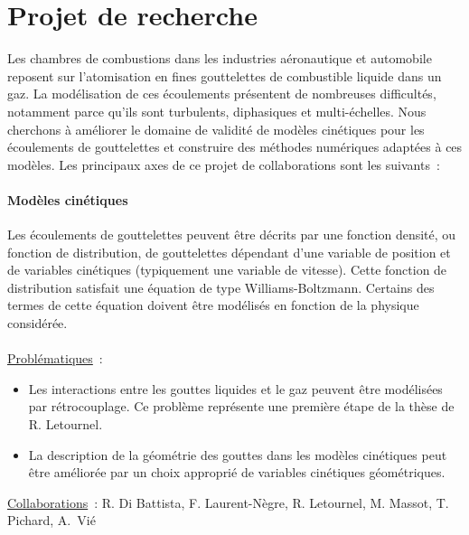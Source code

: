 \documentclass[12pt]{article}
\begin{document}
\section*{Projet de recherche}
Les chambres de combustions dans les industries aéronautique et automobile reposent sur l'atomisation en fines gouttelettes de combustible liquide dans un gaz. La modélisation de ces écoulements présentent de nombreuses difficultés, notamment parce qu'ils sont turbulents, diphasiques et multi-échelles. Nous cherchons à améliorer le domaine de validité de modèles cinétiques pour les écoulements de gouttelettes et construire des méthodes numériques adaptées à ces modèles. Les principaux axes de ce projet de collaborations sont les suivants~:

\paragraph{Modèles cinétiques\\ } 
Les écoulements de gouttelettes peuvent être décrits par une fonction densité, ou fonction de distribution, de gouttelettes dépendant d'une variable de position et de variables cinétiques (typiquement une variable de vitesse). Cette fonction de distribution satisfait une équation de type Williams-Boltzmann. Certains des termes de cette équation doivent être modélisés en fonction de la physique considérée. \\ \\
%
\underline{Problématiques}~: \begin{itemize}
\item Les interactions entre les gouttes liquides et le gaz peuvent être modélisées par rétrocouplage. Ce problème représente une première étape de la thèse de R. Letournel.
\item La description de la géométrie des gouttes dans les modèles cinétiques peut être améliorée par un choix approprié de variables cinétiques géométriques. \\
\end{itemize}
\underline{Collaborations}~: R. Di Battista, F. Laurent-Nègre, R. Letournel, M. Massot, T. Pichard, A.~Vié
\end{document}
